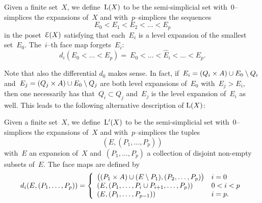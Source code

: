 \begin{definition}\label{def:L}
Given a finite set~$X$, we define~$\mathrm{L}(X)$ to be the semi-simplicial set with~$0$--simplices the expansions of~$X$ and  with~$p$--simplices the sequences 
$$E_0< E_1<E_2<\dots< E_p$$
in the poset~$\mathcal{E}(X)$ satisfying that each~$E_i$ is a level expansion of the smallest set~$E_0$. 
The~$i$--th face map forgets~$E_i$: 
\[
d_i(E_0<\dots<E_p)= \ E_0<\dots<\widehat{E}_i<\dots<E_p.
\]
\end{definition}

Note that also the differential $d_0$ makes sense. In fact,  if~$E_i=(Q_i\times A)\cup E_0\setminus Q_i$ and~$E_j=(Q_j\times A)\cup E_0\setminus Q_j$ are both level expansions of~$E_0$ with~$E_j>E_i$, then one necessarily has that~$Q_i\subset Q_j$ and~$E_j$ is the level expansion of~$E_i$ as well. 
This leads to the following alternative description of $\mathrm{L}(X)$: 

\begin{definition}\label{def:L'}
Given a finite set~$X$, we define~$\mathrm{L}'(X)$ to be the semi-simplicial set with~$0$--simplices the expansions of~$X$ and  with~$p$--simplices the tuples
$$ (E,(P_1,\dots,P_p))$$
with~$E$ an expansion of~$X$ and~$(P_1,\dots,P_p)$ a collection of disjoint non-empty subsets of~$E$. The face maps are defined by
\[
d_i(E,(P_1,\dots,P_p)) =\left\{\begin{array}{ll} \big((P_1\times A)\cup (E\setminus P_1), (P_2,\dots,P_p)\big) & i=0\\
 (E,(P_1,\dots,P_i\cup P_{i+1},\dots,P_p)) & 0< i <p\\
 (E,(P_1,\dots,P_{p-1})) & i=p.
\end{array}\right.
\]
\end{definition}

